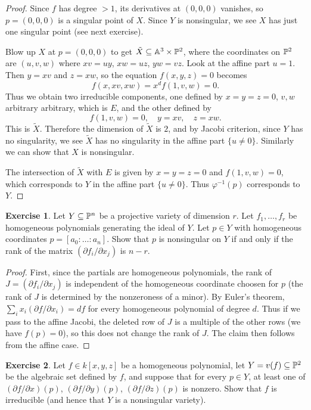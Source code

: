 \documentclass[11pt]{book}
\theoremstyle{definition}
\newtheorem{exercise}{Exercise}[section]
\begin{document}
\begin{proof}
Since $f$ has degree $>1$, its derivatives at $(0,0,0)$ vanishes, so $p=(0,0,0)$ is a singular point of $X$. Since $Y$ is nonsingular, we see $X$ has just one singular point (see next exercise).\par
Blow up $X$ at $p=(0,0,0)$ to get $\tilde{X}\sub\A^3\times\P^2$, where the coordinates on $\P^2$ are $(u,v,w)$ where $xv=uy$, $xw=uz$, $yw=vz$. Look at the affine part $u=1$. Then $y=xv$ and $z=xw$, so the equation $f(x,y,z)=0$ becomes
\[f(x,xv,xw)=x^df(1,v,w)=0.\]
Thus we obtain two irreducible components, one defined by $x=y=z=0$, $v,w$ arbitrary arbitrary, which is $E$, and the other defined by
\[f(1,v,w)=0,\quad y=xv,\quad z=xw.\]
This is $\tilde{X}$. Therefore the dimension of $\tilde{X}$ is $2$, and by Jacobi criterion, since $Y$ has no singularity, we see $\tilde{X}$ has no singularity in the affine part $\{u\neq 0\}$. Similarly we can show that $X$ is nonsingular.\par
The intersection of $\tilde{X}$ with $E$ is given by $x=y=z=0$ and $f(1,v,w)=0$, which corresponds to $Y$ in the affine part $\{u\neq 0\}$. Thus $\varphi^{-1}(p)$ corresponds to $Y$.  
\end{proof}
\begin{exercise}
Let $Y\sub\P^n$ be a projective variety of dimension $r$. Let $f_1,\dots,f_r$ be homogeneous polynomials generating the ideal of $Y$. Let $p\in Y$ with homogeneous coordinates $p=[a_0:\dots:a_n]$. Show that $p$ is nonsingular on $Y$ if and only if the rank of the matrix $(\partial f_i/\partial x_j)$ is $n-r$.
\end{exercise}
\begin{proof}
First, since the partials are homogeneous polynomials, the rank of $J=(\partial f_i/\partial x_j)$ is independent of the homogeneous coordinate choosen for $p$ (the rank of $J$ is determined by the nonzeroness of a minor). By Euler's theorem, $\sum_ix_i(\partial f/\partial x_i)=df$ for every homogeneous polynomial of degree $d$. Thus if we pass to the affine Jacobi, the deleted row of $J$ is a multiple of the other rows (we have $f(p)=0$), so this does not change the rank of $J$. The claim then follows from the affine case.
\end{proof}
\begin{exercise}
Let $f\in k[x,y,z]$ be a homogeneous polynomial, let $Y=v(f)\sub\P^2$ be the algebraic set defined by $f$, and suppose that for every $p\in Y$, at least one of $(\partial f/\partial x)(p)$, $(\partial f/\partial y)(p)$, $(\partial f/\partial z)(p)$ is nonzero. Show that $f$ is irreducible (and hence that $Y$ is a nonsingular variety).
\end{exercise}
\end{document}
